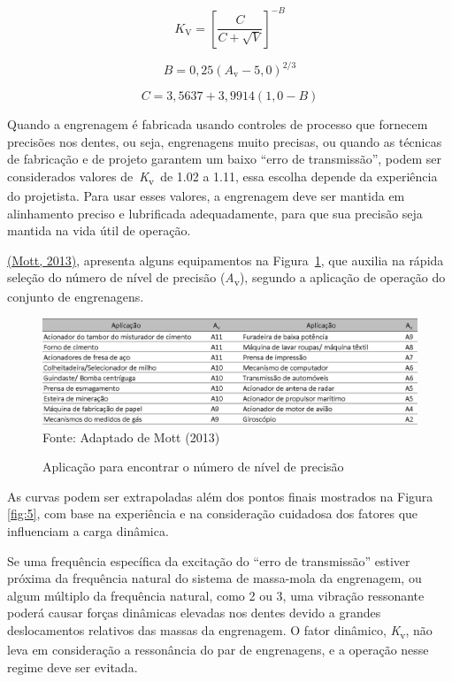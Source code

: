 \documentclass[12pt,a4paper]{article}
\begin{document}
\begin{equation}
    \label{eq4}
    K_{\mathrm{V}}\mathrm{=}{\left[\frac{C}{C+\sqrt{V}}\right]}^{-B}
\end{equation}

\begin{equation}
    \label{eq5}
    B=0,25{(A_{\mathrm{v}}-5,0)}^{{2}/{3}}
\end{equation}

\begin{equation}
    \label{eq6}
    C=3,5637+3,9914(1,0-B)
\end{equation}

Quando a engrenagem é fabricada usando controles de processo que
fornecem precisões nos dentes, ou seja, engrenagens muito precisas, ou
quando as técnicas de fabricação e de projeto garantem um baixo ``erro
de transmissão'', podem ser considerados valores
de~\emph{K}\textsubscript{v}~de 1.02 a 1.11, essa escolha depende da
experiência do projetista. Para usar esses valores, a engrenagem deve
ser mantida em alinhamento preciso e lubrificada adequadamente, para que
sua precisão seja mantida na vida útil de operação.

\hyperref[csl:21]{(Mott, 2013)}, apresenta alguns equipamentos na Figura~\ref{fig:6}, que auxilia na rápida seleção do número
de nível de precisão (\emph{A}\textsubscript{v}), segundo a aplicação de
operação do conjunto de engrenagens.

\begin{figure}[!htb]
    \centering
    \caption{Aplicação para encontrar o número de nível de precisão}
    \includegraphics[scale=0.4]{Imagens/Img6.png}\\
    {\footnotesize Fonte: Adaptado de Mott (2013)}
    \label{fig:6}
\end{figure}

As curvas podem ser extrapoladas além dos pontos finais mostrados na
Figura \ref{fig:5}, com base na experiência e na
consideração cuidadosa dos fatores que influenciam a carga dinâmica.

Se uma frequência específica da excitação do ``erro de transmissão''
estiver próxima da frequência natural do sistema de massa-mola da
engrenagem, ou algum múltiplo da frequência natural, como 2 ou 3, uma
vibração ressonante poderá causar forças dinâmicas elevadas nos dentes
devido a grandes deslocamentos relativos das massas da engrenagem. O
fator dinâmico, \emph{K}\textsubscript{v}, não leva em consideração a
ressonância do par de engrenagens, e a operação nesse regime deve ser
evitada.
\end{document}
